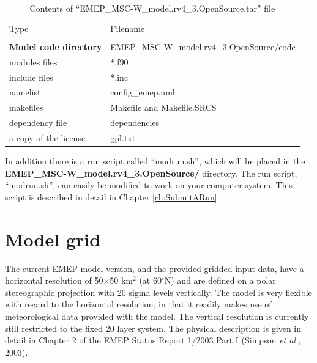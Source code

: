 \begin{table}[h]
\begin{center}
\caption{Contents of ``EMEP\_MSC-W\_model.rv4\_3.OpenSource.tar'' file
   \label{Tab:modelfiles}}
\begin{tabular}{ll}
& \\
\hline
Type      & Filename          \\
\hline
& \\
{\bf Model code directory} & EMEP\_MSC-W\_model.rv4\_3.OpenSource/code \\ 
\hline
modules files & *.f90 \\
include files & *.inc \\
namelist & config\_emep.nml \\
makefiles & Makefile and Makefile.SRCS \\
dependency file &  dependencies\\
a copy of the license & gpl.txt \\
\hline
\end{tabular}
\end{center}
\end{table}

In addition there is a run script called ``modrun.sh'', which will be placed 
in the \\{\bf EMEP\_MSC-W\_model.rv4\_3.OpenSource/}  directory. The run 
script, ``modrun.sh'', can easily be modified to work on your computer system. 
This script is described in detail in Chapter \ref{ch:SubmitARun}. 
 


\section{Model grid}
\label{sec:ModelGrid}

The current EMEP model version, and the provided gridded input data,
have a horizontal resolution of 50$\times$50 km$^2$ (at 60$^\circ$N)
and are defined on a
polar stereographic projection with 20 sigma levels vertically. 
The model is very flexible with regard to the horizontal
resolution, in that it readily makes use of 
meteorological data provided with the model. The vertical
resolution is currently still restricted to the fixed 20 layer
system. The physical
description is given in detail in Chapter 2 of the EMEP Status Report
1/2003 Part I (Simpson {\sl et al.}, 2003).

